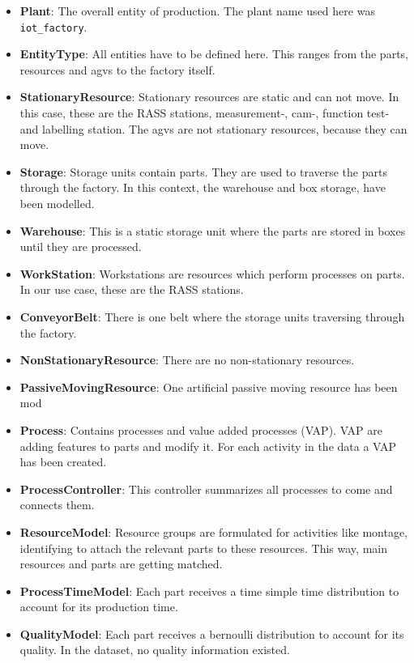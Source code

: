 \begin{itemize}
  \item \textbf{Plant}: The overall entity of production. The plant name used here was \texttt{iot\_factory}.
  \item \textbf{EntityType}: All entities have to be defined here. This ranges from the parts, resources and \gls{agv}s to the factory itself.
  \item \textbf{StationaryResource}: Stationary resources are static and can not move. In this case, these are the RASS stations, measurement-, cam-, function test- and labelling station. The \gls{agv}s are not stationary resources, because they can move.
  \item \textbf{Storage}: Storage units contain parts. They are used to traverse the parts through the factory. In this context, the warehouse and box storage, have been modelled.
  \item \textbf{Warehouse}: This is a static storage unit where the parts are stored in boxes until they are processed.
  \item \textbf{WorkStation}: Workstations are resources which perform processes on parts. In our use case, these are the RASS stations.
  \item \textbf{ConveyorBelt}: There is one belt where the storage units traversing through the factory.
  \item \textbf{NonStationaryResource}: There are no non-stationary resources.
  \item \textbf{PassiveMovingResource}: One artificial passive moving resource has been mod
  \item \textbf{Process}: Contains processes and value added processes (VAP). VAP are adding features to parts and modify it. For each activity in the data a VAP has been created.
  \item \textbf{ProcessController}: This controller summarizes all processes to come and connects them.
  \item \textbf{ResourceModel}: Resource groups are formulated for activities like montage, identifying to attach the relevant parts to these resources. This way, main resources and parts are getting matched.
  \item \textbf{ProcessTimeModel}: Each part receives a time simple time distribution to account for its production time.
  \item \textbf{QualityModel}: Each part receives a bernoulli distribution to account for its quality. In the dataset, no quality information existed.

\end{itemize}

